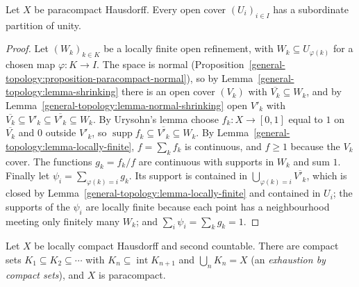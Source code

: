 \begin{theorem}\label{general-topology:theorem-partitions-of-unity}
Let $X$ be paracompact Hausdorff. Every open cover $(U_i)_{i \in I}$ has a subordinate partition of unity.
\end{theorem}

\begin{proof}
Let $(W_k)_{k \in K}$ be a locally finite open refinement, with $W_k \subseteq U_{\varphi(k)}$ for a chosen map $\varphi \colon K \to I$. The space is normal
(Proposition~\ref{general-topology:proposition-paracompact-normal}), so by Lemma~\ref{general-topology:lemma-shrinking} there is an open cover $(V_k)$ with
$\overline{V_k} \subseteq W_k$, and by Lemma~\ref{general-topology:lemma-normal-shrinking} open $V'_k$ with
$\overline{V_k} \subseteq V'_k \subseteq \overline{V'_k} \subseteq W_k$. By Urysohn's lemma choose $f_k \colon X \to [0, 1]$ equal to $1$ on $\overline{V_k}$ and $0$
outside $V'_k$, so $\operatorname{supp} f_k \subseteq \overline{V'_k} \subseteq W_k$. By Lemma~\ref{general-topology:lemma-locally-finite}, $f = \sum_k f_k$ is continuous,
and $f \geq 1$ because the $V_k$ cover. The functions $g_k = f_k/f$ are continuous with supports in $W_k$ and sum $1$. Finally let
$\psi_i = \sum_{\varphi(k) = i} g_k$. Its support is contained in $\bigcup_{\varphi(k) = i}\overline{V'_k}$, which is closed by
Lemma~\ref{general-topology:lemma-locally-finite} and contained in $U_i$; the supports of the $\psi_i$ are locally finite because each point has a neighbourhood
meeting only finitely many $W_k$; and $\sum_i \psi_i = \sum_k g_k = 1$.
\end{proof}

\begin{proposition}\label{general-topology:proposition-exhaustion}
Let $X$ be locally compact Hausdorff and second countable. There are compact sets $K_1 \subseteq K_2 \subseteq \cdots$ with
$K_n \subseteq \operatorname{int} K_{n+1}$ and $\bigcup_n K_n = X$ (an \emph{exhaustion by compact sets}), and $X$ is paracompact.
\end{proposition}

